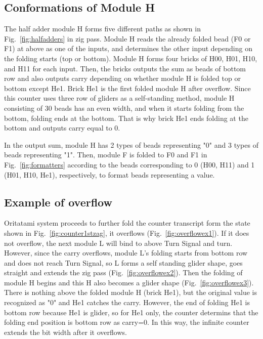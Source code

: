 \documentclass[runningheads]{llncs}
\begin{document}
\subsection{Conformations of Module H}
The half adder module H forms five different paths as shown in Fig.~\ref{fig:halfadders} in zig pass.
Module H reads the already folded bead (F0 or F1) at above as one of the inputs, and determines the other input depending on the folding starts (top or bottom).
Module H forms four bricks of H00, H01, H10, and H11 for each input.
Then, the bricks outputs the sum as beads of bottom row and also outputs carry depending on whether module H is folded top or bottom except He1.
Brick He1 is the first folded module H after overflow.
Since this counter uses three row of gliders as a self-standing method, module H consisting of 30 beads has an even width, and when it starts folding from the bottom, folding ends at the bottom.
That is why brick He1 ends folding at the bottom and outputs carry equal to 0.

In the output sum, module H has 2 types of beads representing "0" and  3 types of beads representing "1".
Then, module F is folded to F0 and F1 in Fig.~\ref{fig:formatters} according to the beads corresponding to 0 (H00, H11) and 1 (H01, H10, He1), respectively, to format beads representing a value.




\subsection{Example of overflow}
Oritatami system proceeds to further fold the counter transcript form the state shown in Fig.~\ref{fig:counter1stzag}, it overflows (Fig.~\ref{fig:overflowex1}).
If it does not overflow, the next module L will bind to above Turn Signal and turn.
However, since the carry overflows, module L's folding starts from bottom row and does not reach Turn Signal, so L forms a self standing glider shape, goes straight and extends the zig pass (Fig.~\ref{fig:overflowex2}).
Then the folding of module H begins and this H also becomes a glider shape (Fig.~\ref{fig:overflowex3}).
There is nothing above the folded module H (brick He1), but the original value is recognized as "0" and He1 catches the carry.
However, the end of folding He1 is bottom row because He1 is glider, so for He1 only, the counter determins that the folding end position is bottom row as carry=0.
In this way, the infinite counter extends the bit width after it overflows.
\end{document}
